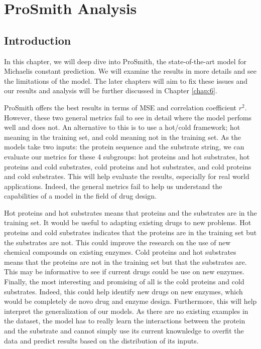 
\chapter{ProSmith Analysis}
\label{chap:2}

\section{Introduction}

In this chapter, we will deep dive into ProSmith, the state-of-the-art model for Michaelis constant
prediction. We will examine the results in more details and see the limitations of the model. The later
chapters will aim to fix these issues and our results and analysis will be further discussed in 
Chapter \ref{chap:6}.

ProSmith offers the best results in terms of MSE and correlation coefficient $r^2$. However, 
these two general metrics fail to see in detail where the model perfoms well and does not. An
alternative to this is to use a hot/cold framework; hot meaning in the training set, and cold 
meaning not in the training set. As the models take two inputs: the protein sequence and 
the substrate string, we can evaluate our metrics for these 4 subgroups: hot proteins and hot substrates, 
hot proteins and cold substrates, cold proteins and hot substrates, and cold proteins and cold substrates. 
This will help evaluate the results, especially for real world applications. Indeed, the general metrics fail to help us understand the capabilities of a model in the field of drug design.

Hot proteins and hot substrates means that proteins and the substrates are in the training set. It would
be useful to adapting existing drugs to new problems. Hot proteins and cold substrates indicates that
the proteins are in the training set but the substrates are not. This could improve the research on the
use of new chemical compounds on existing enzymes. Cold proteins and hot substrates means that the proteins
are not in the training set but that the substrates are. This may be informative to see if current drugs 
could be use on new enzymes. Finally, the most interesting and promising of all is the cold proteins
and cold substrates. Indeed, this could help identify new drugs on new enzymes, which would be completely
de novo drug and enzyme design. Furthermore, this will help interpret the generalization of our models. As
there are no existing examples in the dataset, the model has to really learn the interactions between the
protein and the substrate and cannot simply use its current knownledge to overfit the data and predict
results based on the distribution of its inputs.

